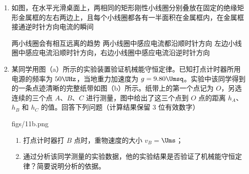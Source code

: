 \documentclass[\gkver]{gaokaozhenti}
\begin{document}
\begin{enumerate}

{$B_1=B_2=B_3$}
{$a$ 和 $b$ 处磁场方向垂直于纸面向外，$c$ 处磁场方向垂直于纸面向里}
{$a$ 处磁场方向垂直于纸面向外，$b$ 和 $c$ 处磁场方向垂直于纸面向里}


\item
如图，在水平光滑桌面上，两相同的矩形刚性小线圈分别叠放在固定的绝缘矩形金属框的左右两边上，且每个小线圈都各有一半面积在金属框内，在金属框接通逆时针方向电流的瞬间


{两小线圈会有相互远离的趋势}
{两小线圈中感应电流都沿顺时针方向}
{左边小线圈中感应电流沿顺时针方向，右边小线圈中感应电流沿逆时针方向}


\item
某同学用图（a）所示的实验装置验证机械能守恒定律。已知打点计时器所用电源的频率为 $50\UHz$，当地重力加速度为 $g=9.80\Umsq$。实验中该同学得到的一条点迹清晰的完整纸带如图（b）所示。纸带上的第一个点记为 $O$，另选连续的三个点 $A$、$B$、$C$ 进行测量，图中给出了这三个点到 $O$ 点的距离 $h_A$、$h_B$ 和 $h_C$ 的值。回答下列问题（计算结果保留 3 位有效数字）

{figs/11b.png}

\begin{enumerate}
	\item
	打点计时器打 $B$ 点时，重物速度的大小 $v_B=$$\Ums$；

	\item
	通过分析该同学测量的实验数据，他的实验结果是否验证了机械能守恒定律？简要说明分析的依据。
\end{enumerate}


\end{enumerate}
\end{document}
